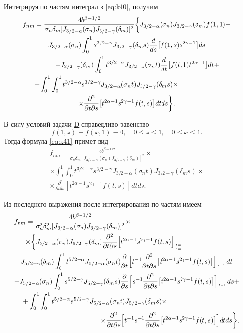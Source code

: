 	Интегрируя по частям интеграл в \eqref{eq:k40}, получим
\begin{multline}
f_{nm}=\frac{4b^{\beta- 1/2 }}{\sigma_n\delta_m[J_{3/2-\alpha}(\sigma_n)J_{3/2-\gamma}(\delta_m)]^2} 
\biggl\{
J_{3/2-\alpha}(\sigma_n)J_{3/2-\gamma}(\delta_m)f(1,1)-
\\
-J_{3/2-\alpha}(\sigma_n)\int_0^1
s^{3/2-\gamma}J_{3/2-\gamma}(\delta_m s)\frac{d}{ds}\bigl[f(1,s)s^{2\gamma-1}\bigr]ds-
\\
\hfill
-J_{3/2-\gamma}(\delta_m)\int_0^1
t^{3/2-\alpha}J_{3/2-\alpha}(\sigma_n t)\frac{d}{dt}\bigl[f(t,1)t^{2\alpha-1}\bigr]dt+~~~~~
\\
~~~~~
+\int_0^1 \int_0^1
t^{3/2-\alpha}s^{3/2-\gamma}J_{3/2-\alpha}(\sigma_n t)J_{3/2-\gamma}(\delta_m s)\times \hfill
\\
\times\frac{\partial^2}{\partial t\partial s} \bigl[t^{2\alpha-1}s^{2\gamma-1}f(t,s)\bigr]dtds
\biggr \}.
\label{eq:k41}
\end{multline}

В силу условий задачи \hyperlink{task:D}{D}
справедливо равенство
\begin{equation}
f(1,z)=f(x,1)=0,\quad 0\le z\le 1,\quad 0 \le x \le 1.
\label{eq:k42}
\end{equation}
Тогда формула \eqref{eq:k41} примет вид
\begin{multline*}
f_{nm}=\frac{4b^{\beta- 1/2 }}{\sigma_n\delta_m[J_{3/2-\alpha}(\sigma_n)J_{3/2-\gamma}(\delta_m)]^2}\times 
\\
\times\int_0^1 \int_0^1 t^{3/2-\alpha}s^{3/2-\gamma}J_{3/2-\alpha}(\sigma_n t)J_{3/2-\gamma}(\delta_m s) 
\times
\\
\times
\frac{\partial^2}{\partial t\partial s}[t^{2\alpha-1}s^{2\gamma-1}f(t,s)]dtds .
\end{multline*}




	Из последнего выражения после интегрирования по частям имеем
\begin{multline*}
f_{nm}=\frac{4b^{\beta- 1/2 }}{\sigma_n^2\delta_m^2[J_{3/2-\alpha}(\sigma_n)J_{3/2-\gamma}(\delta_m)]^2}\times
\hfill
\\
~~~~~\times
\biggl\{ 
J_{5/2-\alpha}(\sigma_n)J_{5/2-\gamma}(\delta_m)\frac{\partial^2}{\partial t\partial s}\Bigl[t^{2\alpha-1}s^{2\gamma-1}f(t,s)\Bigr]_{t = 1 \atop s = 1}- \hfill
\\
-J_{5/2-\gamma}(\delta_m)\int_0^1{t^{5/2-\alpha}J_{5/2-\alpha}(\sigma_n t)
\frac{\partial}{\partial t}
\Bigl[t^{-1}\frac{\partial^2}{\partial t\partial s}\bigl[t^{2\alpha-1}s^{2\gamma-1}f(t,s) \bigr]\Bigr]_{s=1 \atop{} }dt}-
\\
-J_{5/2-\alpha}(\sigma_n)\int_0^1{s^{5/2-\gamma}J_{5/2-\gamma}(\delta_m s)\frac{\partial}{\partial s}
\Bigl[s^{-1}\frac{\partial^2}{\partial t\partial s}\bigl[t^{2\alpha-1}s^{2\gamma-1}f(t,s)\bigr]\Bigr]_{t=1 \atop{}}ds+}
\\
~~~~
+\int_0^1 \int_0^1 
t^{5/2-\alpha}s^{5/2-\gamma}J_{5/2-\alpha}(\sigma_n t)J_{5/2-\gamma}(\delta_m s)\times
\hfill
\\ \hfill
\times\frac{\partial^2}{\partial t\partial s}
\Bigl[t^{-1}s^{-1}\frac{\partial^2}{\partial t\partial s}\bigl[t^{2\alpha-1}s^{2\gamma-1}f(t,s)\bigr]\Bigr]dtds\biggr\}.
\end{multline*}


